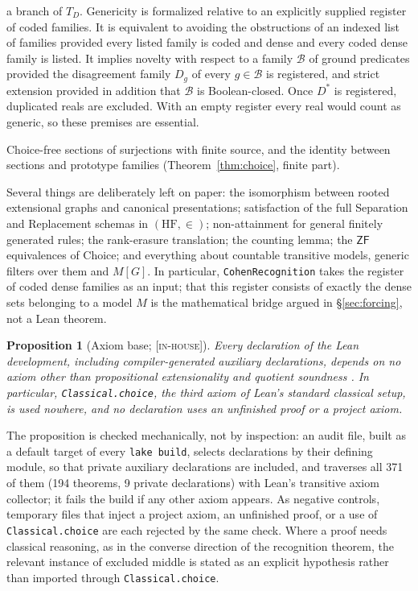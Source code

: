 \documentclass[11pt]{article}
\newcommand{\HF}{\mathrm{HF}}                 \newcommand{\rank}{\operatorname{rank}}
\newcommand{\gradetag}[1]{\textnormal{\textsc{[#1]}}}
\newcommand{\inhouse}{\gradetag{in-house}}
\newtheorem{proposition}[theorem]{Proposition}
\theoremstyle{definition}
\begin{document}
\begin{description}[leftmargin=1.2em, itemsep=2pt]
a branch of $T_D$. Genericity is formalized relative to an explicitly supplied register of coded
families. It is equivalent to avoiding the obstructions of an indexed list of families provided
every listed family is coded and dense and every coded dense family is listed. It implies novelty
with respect to a family $\mathcal B$ of ground predicates provided the disagreement family $D_g$ of
every $g\in\mathcal B$ is registered, and strict extension provided in addition that $\mathcal B$ is
Boolean-closed. Once $D^\ast$ is registered, duplicated reals are excluded. With an empty register
every real would count as generic, so these premises are essential.
\item[\texttt{LiftChoice}.] Choice-free sections of surjections with finite source, and the
identity between sections and prototype families (Theorem~\ref{thm:choice}, finite part).
\end{description}

Several things are deliberately left on paper: the isomorphism between rooted extensional graphs
and canonical presentations; satisfaction of the full Separation and Replacement schemas in
$(\HF,\in)$; non-attainment for general finitely generated rules; the rank-erasure translation;
the counting lemma; the $\mathsf{ZF}$ equivalences of Choice; and everything about countable
transitive models, generic filters over them and $M[G]$. In particular, \texttt{CohenRecognition}
takes the register of coded dense families as an input; that this register consists of exactly
the dense sets belonging to a model $M$ is the mathematical bridge argued in \S\ref{sec:forcing},
not a Lean theorem.

\begin{proposition}[Axiom base; \inhouse]\label{prop:axioms}
Every declaration of the Lean development, including compiler-generated auxiliary declarations,
depends on no axiom other than propositional extensionality and quotient soundness
\citep{Carneiro2019}. In particular, \texttt{Classical.choice}, the third axiom of Lean's standard
classical setup, is used nowhere, and no declaration uses an unfinished proof or a project axiom.
\end{proposition}

The proposition is checked mechanically, not by inspection: an audit file, built as a default
target of every \texttt{lake build}, selects declarations by their defining module, so that private auxiliary declarations are
included, and traverses all 371 of them (194 theorems, 9 private declarations) with Lean's
transitive axiom collector; it fails the build if any other axiom appears. As negative controls,
temporary files that inject a project axiom, an unfinished proof, or a use of
\texttt{Classical.choice} are each rejected by the same check. Where a proof needs classical reasoning, as in the
converse direction of the recognition theorem, the relevant instance of excluded middle is stated
as an explicit hypothesis rather than imported through \texttt{Classical.choice}.
\end{document}
